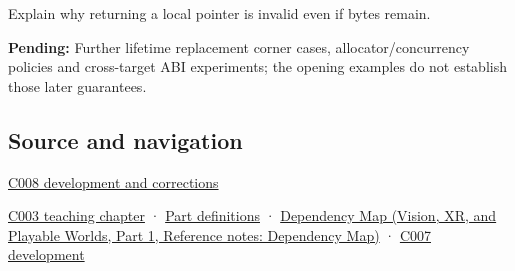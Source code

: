 \hypertarget{appendix-0b104bcba06b-recall-and-next-depth}{}

Explain why returning a local pointer is invalid even if bytes remain.

\textbf{Pending:} Further lifetime replacement corner cases, allocator/concurrency policies and cross-target ABI experiments; the opening examples do not establish those later guarantees.

\subsection{Source and navigation}\label{appendix-0b104bcba06b-source-and-navigation}

\hypertarget{appendix-0b104bcba06b-source-and-navigation}{}

\hyperref[appendix-fd090d982a15-m008---parts-113-126]{C008 development and corrections}

\hyperref[01-foundations-i-ch002-where-the-bytes-live]{C003 teaching chapter} · \hyperref[appendix-fd090d982a15-m003---parts-41-60]{Part definitions} · \href{../07-Vision-XR-and-Playable-Worlds-P01/main.pdf\#nameddest=appendix-4ad47bdd269a}{Dependency Map (Vision, XR, and Playable Worlds, Part 1, Reference notes: Dependency Map)} · \hyperref[01-foundations-i-ch002-storage-is-a-place-an-object-is-its-occupant]{C007 development}
